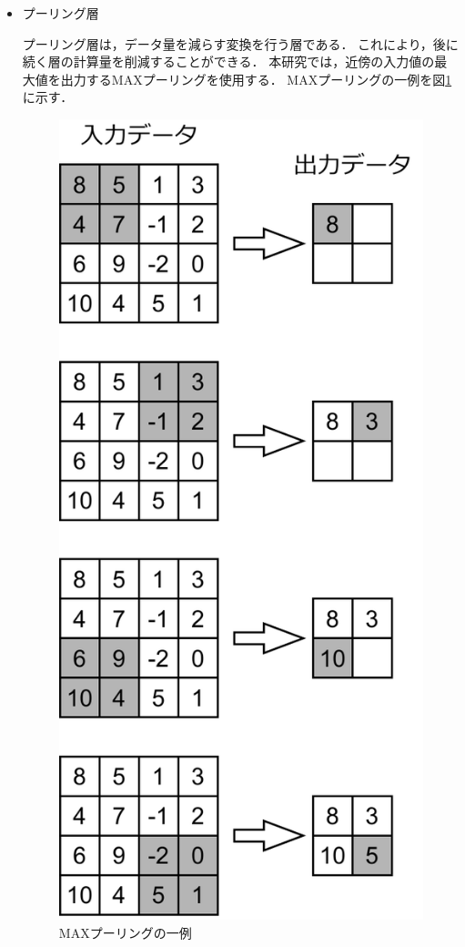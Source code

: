 \documentclass{thesis}
\begin{document}
\begin{itemize}
	
	
	\item プーリング層
	
	プーリング層は，データ量を減らす変換を行う層である．
	これにより，後に続く層の計算量を削減することができる．
	本研究では，近傍の入力値の最大値を出力するMAXプーリングを使用する．
	MAXプーリングの一例を図\ref{fig:pooling}に示す．
	\begin{figure}[H]
		\centering
		\includegraphics[scale=0.5]{./image/pooling.pdf}
		\caption{MAXプーリングの一例}
		\label{fig:pooling}
	\end{figure}
	

\end{itemize}
\end{document}
